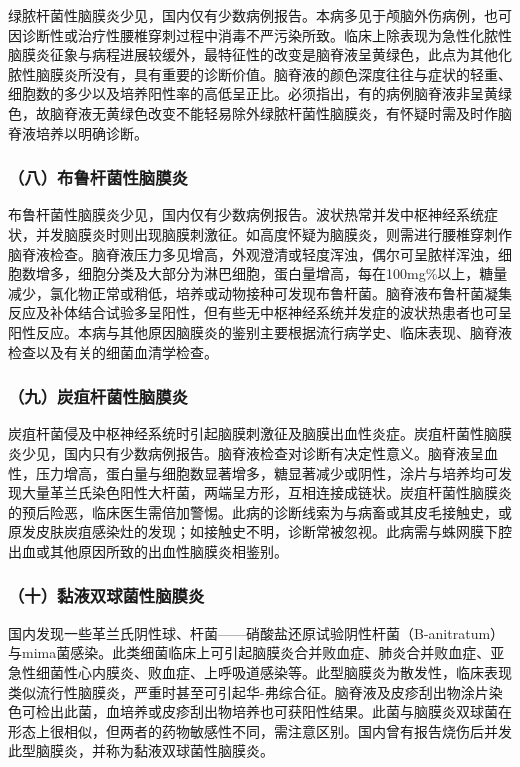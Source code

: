 绿脓杆菌性脑膜炎少见，国内仅有少数病例报告。本病多见于颅脑外伤病例，也可因诊断性或治疗性腰椎穿刺过程中消毒不严污染所致。临床上除表现为急性化脓性脑膜炎征象与病程进展较缓外，最特征性的改变是脑脊液呈黄绿色，此点为其他化脓性脑膜炎所没有，具有重要的诊断价值。脑脊液的颜色深度往往与症状的轻重、细胞数的多少以及培养阳性率的高低呈正比。必须指出，有的病例脑脊液非呈黄绿色，故脑脊液无黄绿色改变不能轻易除外绿脓杆菌性脑膜炎，有怀疑时需及时作脑脊液培养以明确诊断。

\subsubsection{（八）布鲁杆菌性脑膜炎}

布鲁杆菌性脑膜炎少见，国内仅有少数病例报告。波状热常并发中枢神经系统症状，并发脑膜炎时则出现脑膜刺激征。如高度怀疑为脑膜炎，则需进行腰椎穿刺作脑脊液检查。脑脊液压力多见增高，外观澄清或轻度浑浊，偶尔可呈脓样浑浊，细胞数增多，细胞分类及大部分为淋巴细胞，蛋白量增高，每在100mg\%以上，糖量减少，氯化物正常或稍低，培养或动物接种可发现布鲁杆菌。脑脊液布鲁杆菌凝集反应及补体结合试验多呈阳性，但有些无中枢神经系统并发症的波状热患者也可呈阳性反应。本病与其他原因脑膜炎的鉴别主要根据流行病学史、临床表现、脑脊液检查以及有关的细菌血清学检查。

\subsubsection{（九）炭疽杆菌性脑膜炎}

炭疽杆菌侵及中枢神经系统时引起脑膜刺激征及脑膜出血性炎症。炭疽杆菌性脑膜炎少见，国内只有少数病例报告。脑脊液检查对诊断有决定性意义。脑脊液呈血性，压力增高，蛋白量与细胞数显著增多，糖显著减少或阴性，涂片与培养均可发现大量革兰氏染色阳性大杆菌，两端呈方形，互相连接成链状。炭疽杆菌性脑膜炎的预后险恶，临床医生需倍加警惕。此病的诊断线索为与病畜或其皮毛接触史，或原发皮肤炭疽感染灶的发现；如接触史不明，诊断常被忽视。此病需与蛛网膜下腔出血或其他原因所致的出血性脑膜炎相鉴别。

\subsubsection{（十）黏液双球菌性脑膜炎}

国内发现一些革兰氏阴性球、杆菌------硝酸盐还原试验阴性杆菌（B-anitratum）与mima菌感染。此类细菌临床上可引起脑膜炎合并败血症、肺炎合并败血症、亚急性细菌性心内膜炎、败血症、上呼吸道感染等。此型脑膜炎为散发性，临床表现类似流行性脑膜炎，严重时甚至可引起华-弗综合征。脑脊液及皮疹刮出物涂片染色可检出此菌，血培养或皮疹刮出物培养也可获阳性结果。此菌与脑膜炎双球菌在形态上很相似，但两者的药物敏感性不同，需注意区别。国内曾有报告烧伤后并发此型脑膜炎，并称为黏液双球菌性脑膜炎。

